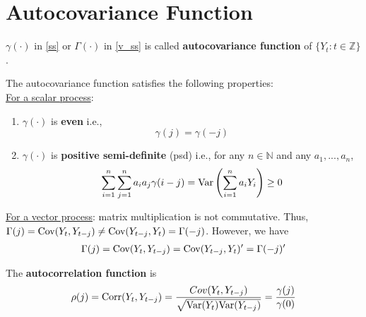 \documentclass[11pt]{elegantbook}
\begin{document}
\section{Autocovariance Function}
\begin{definition}
    $\gamma(\cdot)$ in \eqref{ss} or $\Gamma(\cdot)$ in \eqref{v_ss} is called \textbf{autocovariance function} of $\{Y_t:t\in \mathbb{Z}\}$.
\end{definition}

\begin{lemma}\label{lemma_ACF property}
    The autocovariance function satisfies the following properties:\\
    \underline{For a scalar process}:
    \begin{enumerate}
        \item $\gamma(\cdot)$ is \textbf{even} i.e., $$\gamma(j)=\gamma(-j)$$
        \item $\gamma(\cdot)$ is \textbf{positive semi-definite} (psd) i.e., for any  $n\in \mathbb{N}$ and any $a_1,...,a_n$,
        \begin{equation}
            \begin{aligned}
                \sum_{i=1}^n\sum_{j=1}^na_ia_j\gamma(i-j)=\textnormal{Var}\left(\sum_{i=1}^na_iY_i\right)\geq 0
            \end{aligned}
            \nonumber
        \end{equation}
    \end{enumerate}
    \underline{For a vector process}: matrix multiplication is not commutative. Thus, $\Gamma(j)=\textnormal{Cov}(Y_t,Y_{t-j})\neq \textnormal{Cov}(Y_{t-j},Y_t)=\Gamma(-j)$. However, we have
    \begin{equation}
        \begin{aligned}
            \Gamma(j)=\textnormal{Cov}(Y_t,Y_{t-j})=\textnormal{Cov}(Y_{t-j},Y_t)'=\Gamma(-j)'
        \end{aligned}
        \nonumber
    \end{equation}
\end{lemma}

\begin{definition}
    The \textbf{autocorrelation function} is $$\rho(j)=\textnormal{Corr}(Y_t,Y_{t-j})=\frac{Cov(Y_t,Y_{t-j})}{\sqrt{\textnormal{Var}(Y_t)\textnormal{Var}(Y_{t-j})}}=\frac{\gamma(j)}{\gamma(0)}$$
\end{definition}
\end{document}
